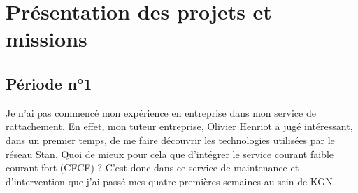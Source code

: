 \documentclass{article}
\begin{document}
\section{Présentation des projets et missions}

    \subsection{Période n°1}
        Je n'ai pas commencé mon expérience en entreprise dans mon service de 
        rattachement. En effet, mon tuteur entreprise, Olivier Henriot a jugé 
        intéressant, dans un premier temps, de me faire découvrir les 
        technologies utilisées par le réseau Stan. Quoi de mieux pour cela que 
        d'intégrer le service courant faible courant fort (CFCF) ? C'est donc 
        dans ce service de maintenance et d'intervention que j'ai passé mes 
        quatre premières semaines au sein de KGN.
\end{document}
